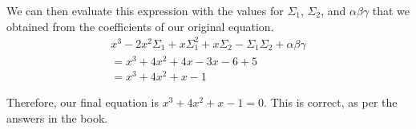 \documentclass[a4paper]{article}
\newcommand{\abg}{\alpha\beta\gamma}
\newcommand{\Sone}{\Sigma_1}
\newcommand{\Stwo}{\Sigma_2}
\begin{document}
We can then evaluate this expression with the values for $\Sone$, $\Stwo$, and $\abg$ that we obtained from the coefficients of our original equation.
\begin{gather*}
x^3 - 2x^2\Sone + x\Sone^2 + x\Stwo - \Sone\Stwo + \abg\\[0.5em]
= x^3 + 4x^2 + 4x - 3x - 6 + 5\\[0.5em]
= x^3 + 4x^2 + x - 1
\end{gather*}

Therefore, our final equation is $x^3 + 4x^2 + x - 1 = 0$. This is correct, as per the answers in the book.
\end{document}
